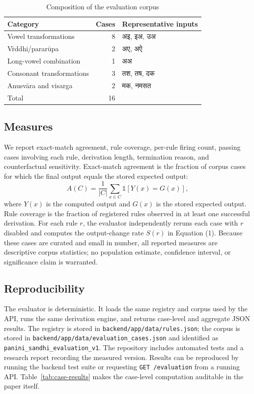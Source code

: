\documentclass[conference]{IEEEtran}
\newcommand{\skt}[1]{{\devanagarifont #1}}
\newcommand{\code}[1]{\texttt{#1}}
\begin{document}
\begin{table}[t]
\caption{Composition of the evaluation corpus}
\label{tab:corpus}
\centering
\small
\begin{tabular}{lrl}
\toprule
Category & Cases & Representative inputs \\
\midrule
Vowel transformations & 8 & \skt{अइ}, \skt{इअ}, \skt{उअ} \\
V\=rddhi/parar\=upa & 2 & \skt{अए}, \skt{अऐ} \\
Long-vowel combination & 1 & \skt{अअ} \\
Consonant transformations & 3 & \skt{तश}, \skt{तष}, \skt{दक} \\
Anusv\=ara and visarga & 2 & \skt{मक}, \skt{नमसत} \\
\midrule
Total & 16 & \\
\bottomrule
\end{tabular}
\end{table}

\subsection{Measures}
We report exact-match agreement, rule coverage, per-rule firing count, passing cases involving each rule, derivation length, termination reason, and counterfactual sensitivity. Exact-match agreement is the fraction of corpus cases for which the final output equals the stored expected output:
\begin{equation}
  A(C)=\frac{1}{|C|}\sum_{x\in C}\mathbb{1}[Y(x)=G(x)],
\end{equation}
where $Y(x)$ is the computed output and $G(x)$ is the stored expected output. Rule coverage is the fraction of registered rules observed in at least one successful derivation. For each rule $r$, the evaluator independently reruns each case with $r$ disabled and computes the output-change rate $S(r)$ in Equation (1). Because these cases are curated and small in number, all reported measures are descriptive corpus statistics; no population estimate, confidence interval, or significance claim is warranted.

\subsection{Reproducibility}
The evaluator is deterministic. It loads the same registry and corpus used by the API, runs the same derivation engine, and returns case-level and aggregate JSON results. The registry is stored in \code{backend/app/data/rules.json}; the corpus is stored in \code{backend/app/data/evaluation\_cases.json} and identified as \code{panini\_sandhi\_evaluation\_v1}. The repository includes automated tests and a research report recording the measured version. Results can be reproduced by running the backend test suite or requesting \code{GET /evaluation} from a running API. Table~\ref{tab:case-results} makes the case-level computation auditable in the paper itself.
\end{document}

